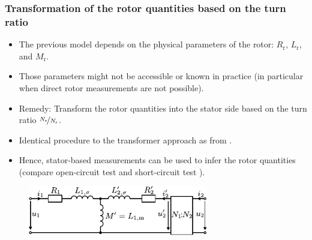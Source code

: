\begin{frame}
	\frametitle{Transformation of the rotor quantities based on the turn ratio}
    \begin{itemize}
        \item The previous model depends on the physical parameters of the rotor:  $R_\mathrm{r}$, $L_\mathrm{r}$, and $M_\mathrm{r}$.
        \item Those parameters might not be accessible or known in practice (in particular when direct rotor measurements are not possible).
        \item Remedy: Transform the rotor quantities into the stator side based on the turn ratio $\nicefrac{N_\mathrm{s}}{N_\mathrm{r}}$.
        \item Identical procedure to the transformer approach as from . 
        \item Hence, stator-based measurements can be used to infer the rotor quantities (compare open-circuit test  and short-circuit test ).
    \end{itemize}
    \begin{figure}
        \centering
        \includegraphics[width=0.7\textwidth]{fig/lec04/Transformer_T_ECD_turn_transf.pdf}
	\end{figure}	
\end{frame}

